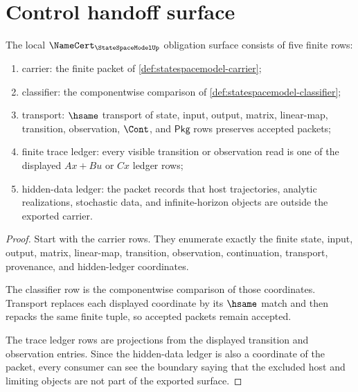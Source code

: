 \section{Control handoff surface}
\label{sec:statespacemodel-control-handoff}

\begin{theorem}
\label{thm:statespacemodel-namecert-obligation-surface}
The local $\NameCert_{\StateSpaceModelUp}$ obligation surface consists of five finite rows:
\begin{enumerate}
\item carrier: the finite packet of \autoref{def:statespacemodel-carrier};
\item classifier: the componentwise comparison of \autoref{def:statespacemodel-classifier};
\item transport: $\hsame$ transport of state, input, output, matrix, linear-map, transition, observation, $\Cont$, and $\mathsf{Pkg}$ rows preserves accepted packets;
\item finite trace ledger: every visible transition or observation read is one of the displayed $Ax+Bu$ or $Cx$ ledger rows;
\item hidden-data ledger: the packet records that host trajectories, analytic realizations, stochastic data, and infinite-horizon objects are outside the exported carrier.
\end{enumerate}
\end{theorem}
\begin{proof}
Start with the carrier rows. They enumerate exactly the finite state, input, output, matrix, linear-map, transition, observation, continuation, transport, provenance, and hidden-ledger coordinates.

The classifier row is the componentwise comparison of those coordinates. Transport replaces each displayed coordinate by its $\hsame$ match and then repacks the same finite tuple, so accepted packets remain accepted.

The trace ledger rows are projections from the displayed transition and observation entries. Since the hidden-data ledger is also a coordinate of the packet, every consumer can see the boundary saying that the excluded host and limiting objects are not part of the exported surface.
\end{proof}

